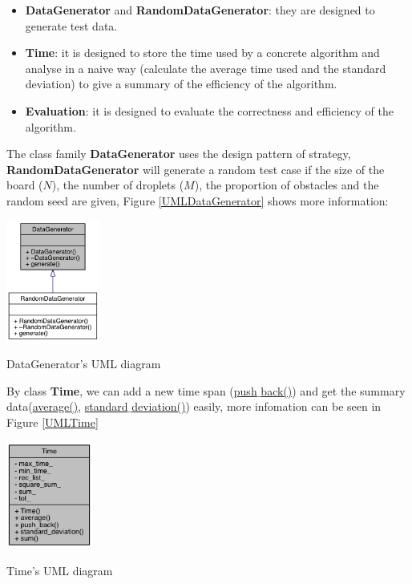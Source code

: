 \documentclass[twocolumn]{article}
\begin{document}
\begin{itemize}
    \item \textbf{DataGenerator} and \textbf{RandomDataGenerator}: they are designed to generate test data.
    \item \textbf{Time}: it is designed to store the time used by a concrete algorithm and analyse in a naive way (calculate the average time used and the standard deviation) to give a summary of the efficiency of the algorithm.
    \item \textbf{Evaluation}: it is designed to evaluate the correctness and efficiency of the algorithm.
\end{itemize}

The class family \textbf{DataGenerator} uses the design pattern of strategy, \textbf{RandomDataGenerator} will generate a random test case if the size of the board ($N$), the number of droplets ($M$), the proportion of obstacles and the random seed are given, Figure \ref{UMLDataGenerator} shows more information:

\begin{center}
\makeatletter
\def\@captype{figure}
\makeatother
\includegraphics [height=4cm]{UMLDataGenerator}
\caption{DataGenerator's UML diagram}
\label{UMLDataGenerator}
\end{center}

By class \textbf{Time}, we can add a new time span (\underline{push$\_$back()}) and get the summary data(\underline{average()}, \underline{standard$\_$deviation()}) easily, more infomation can be seen in Figure \ref{UMLTime}

\begin{center}
\makeatletter
\def\@captype{figure}
\makeatother
\includegraphics [height=3.5cm]{UMLTime}
\caption{Time's UML diagram}
\label{UMLTime}
\end{center}
\end{document}
